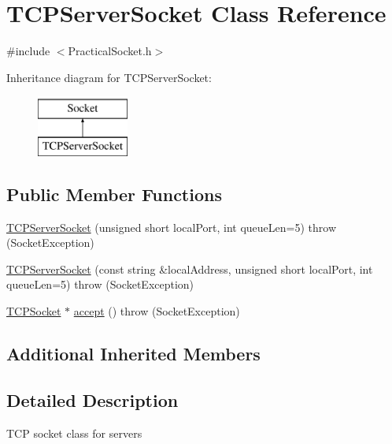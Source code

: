 \hypertarget{classTCPServerSocket}{\section{T\-C\-P\-Server\-Socket Class Reference}
\label{classTCPServerSocket}
}


{\ttfamily \#include $<$Practical\-Socket.\-h$>$}

Inheritance diagram for T\-C\-P\-Server\-Socket\-:\begin{figure}[H]
\begin{center}
\leavevmode
\includegraphics[height=2.000000cm]{classTCPServerSocket}
\end{center}
\end{figure}
\subsection*{Public Member Functions}
\begin{DoxyCompactItemize}
\item 
\hyperlink{classTCPServerSocket_ae559a3154527d09fe14a8e5ee1f53d7a}{T\-C\-P\-Server\-Socket} (unsigned short local\-Port, int queue\-Len=5)  throw (\-Socket\-Exception)
\item 
\hyperlink{classTCPServerSocket_a3908fecb1b038f7c14fcc7726f54d01d}{T\-C\-P\-Server\-Socket} (const string \&local\-Address, unsigned short local\-Port, int queue\-Len=5)  throw (\-Socket\-Exception)
\item 
\hyperlink{classTCPSocket}{T\-C\-P\-Socket} $\ast$ \hyperlink{classTCPServerSocket_a1d161137e1b069de7a7bfc14d3f8212c}{accept} ()  throw (\-Socket\-Exception)
\end{DoxyCompactItemize}
\subsection*{Additional Inherited Members}


\subsection{Detailed Description}
T\-C\-P socket class for servers 

